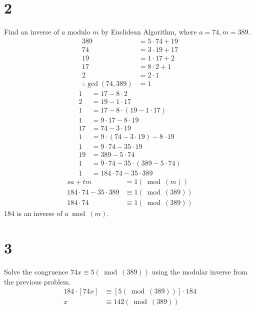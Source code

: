 \documentclass{article}
\begin{document}
\section{2}

Find an inverse of $ a $ modulo $ m $ by Euclidean Algorithm, where $ a = 74, m = 389 $.
\begin{align*}
	389                      & = 5 \cdot 74 + 19 \\
	74                       & = 3 \cdot 19 + 17 \\
	19                       & = 1 \cdot 17 + 2  \\
	17                       & = 8 \cdot 2 + 1   \\
	2                        & = 2 \cdot 1       \\
	\therefore \gcd(74, 389) & = 1
\end{align*}
\begin{align*}
	1  & = 17 - 8 \cdot 2                           \\
	2  & = 19 - 1 \cdot 17                          \\
	1  & = 17 - 8 \cdot (19 - 1 \cdot 17)           \\
	1  & = 9 \cdot 17 - 8 \cdot 19                  \\
	17 & = 74 - 3 \cdot 19                          \\
	1  & = 9 \cdot (74 - 3 \cdot 19) - 8 \cdot 19   \\
	1  & = 9 \cdot 74 - 35 \cdot 19                 \\
	19 & = 389 - 5 \cdot 74                         \\
	1  & = 9 \cdot 74 - 35 \cdot (389 - 5 \cdot 74) \\
	1  & = 184 \cdot 74 - 35 \cdot 389
\end{align*}
\begin{align*}
	sa + tm                     & = 1(\bmod(m))         \\
	184 \cdot 74 - 35 \cdot 389 & \equiv 1 (\bmod(389)) \\
	184 \cdot 74                & \equiv 1 (\bmod(389))
\end{align*}
184 is an inverse of $ a \bmod(m) $.

\section{3}

Solve the congruence $ 74x \equiv 5(\bmod(389)) $ using the modular inverse from the previous problem.
\begin{align*}
	184 \cdot \left[ 74x \right] & \equiv \left[ 5(\bmod(389)) \right] \cdot 184 \\
	x                            & \equiv 142(\bmod(389))
\end{align*}
\end{document}
